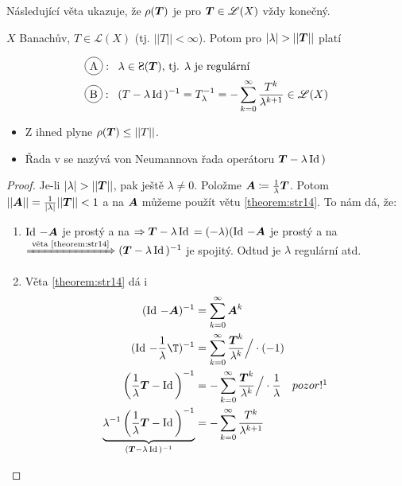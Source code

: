 Následující věta ukazuje, že $\rho(\boldsymbol{T})$ je pro $\boldsymbol{T} \in \mathscr{L}(X)$ vždy konečný.
\begin{theorem}
\label{theorem:str26}
    $X$ Banachův, $T\in \mathscr{L}(X)$ (tj. $||T||<\infty$). Potom pro $|\lambda|>||\map T||$ platí

\begin{align*}
        &\circled{A}:\;\; \lambda \in \Sp(\map T)\text{, tj. } \lambda \text{ je regulární}  \\
        &\circled{B}:\;\; (T-\lambda\Id)^{-1}=T_\lambda^{-1}=-\sum\limits_{k=0}^\infty\frac{T^k}{\lambda^{k+1}}\in\mathscr{L}(X) 
\end{align*}
\end{theorem}

\Poznamka \begin{itemize}
    \item Z  ihned plyne $\rho(\boldsymbol{T}) \leq ||T||$.
    \item Řada v  se nazývá von Neumannova řada operátoru $\boldsymbol{T}-\lambda \operatorname{Id}\,)$
\end{itemize}
\begin{proof}
    Je-li $|\lambda|>||\map T||$, pak ještě $\lambda\neq0$. Položme $\boldsymbol{A}\coloneqq\frac{1}{\lambda}\boldsymbol{T}$. Potom $||\boldsymbol{A}||=\frac{1}{|\lambda|}||\boldsymbol{T}||<1$ a na $\boldsymbol{A}$ můžeme použít větu \ref{theorem:str14}. To nám dá, že:
    \begin{enumerate}[label*=.]
        \item[\circled{A}] $\operatorname{Id}\,-\boldsymbol{A}$ je prostý a na $\Rightarrow \boldsymbol{T}-\lambda\operatorname{Id}\,=(-\lambda)(\operatorname{Id}\,-\boldsymbol{A}$ je prostý a na $\xRightarrow{\text{ věta \ref{theorem:str14}}} (\boldsymbol{T}-\lambda\operatorname{Id}\, )^{-1}$ je spojitý. Odtud je $\lambda$ regulární atd.
        \item[\circled{B}] Věta \ref{theorem:str14} dá i 
        \begin{align*}
            (\Id-\map A)^{-1}&=\sum\limits_{k=0}^\infty \map A^k\\
            (\Id-\frac{1}{\lambda}\T)^{-1}&=\sum\limits_{k=0}^\infty\frac{\map T^k}{\lambda^k} \Big/ \cdot (-1)\\
            \left(\frac{1}{\lambda}\map T-\Id \right)^{-1}&=-\sum\limits_{k=0}^\infty\frac{\map T^k}{\lambda^k} \Big/\cdot \frac{1}{\lambda} \quad pozor!\footnotemark\\
            \underbrace{\lambda^{-1}\left(\frac{1}{\lambda}\map T-\Id \right)^{-1}}_{(\map T-\lambda \Id)^{-1}}&=-\sum\limits_{k=0}^\infty\frac{T^k}{\lambda^{k+1}}
        \end{align*}
      \end{enumerate}
\end{proof}

